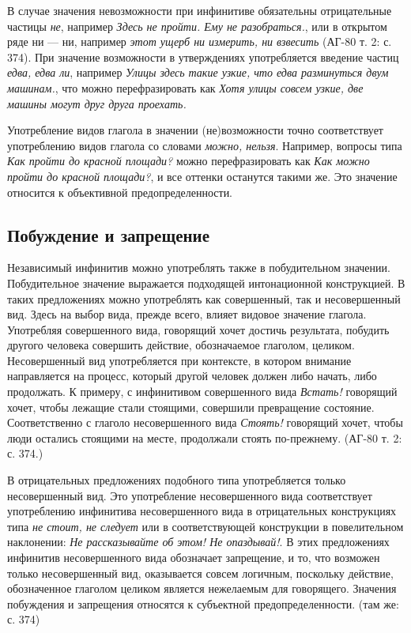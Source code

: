 В случае значения невозможности при инфинитиве обязательны отрицательные частицы \textit{не}, например \textit{Здесь не пройти. Ему не разобраться.}, или в открытом ряде ни --- ни, например \textit{этот ущерб ни измерить, ни взвесить} (АГ-80 т. 2: с. 374). При значение возможности в утверждениях употребляется введение частиц \textit{едва, едва ли}, например \textit{Улицы здесь такие узкие, что едва разминуться двум машинам.}, что можно перефразировать как \textit{Хотя улицы совсем узкие, две машины могут друг друга проехать.} 

Употребление видов глагола в значении (не)возможности точно соответствует употреблению видов глагола со словами \textit{можно, нельзя}. Например, вопросы типа \textit{Как пройти до красной площади?} можно перефразировать как \textit{Как можно пройти до красной площади?}, и все оттенки останутся такими же. Это значение относится к объективной предопределенности.

\subsection{Побуждение и запрещение}

Независимый инфинитив можно употреблять также в побудительном значении. Побудительное значение выражается подходящей интонационной конструкцией. В таких предложениях можно употреблять как совершенный, так и несовершенный вид. Здесь на выбор вида, прежде всего, влияет видовое значение глагола. Употребляя совершенного вида, говорящий хочет достичь результата, побудить другого человека совершить действие, обозначаемое глаголом, целиком. Несовершенный вид употребляется при контексте, в котором внимание направляется на процесс, который другой человек должен либо начать, либо продолжать. К примеру, с инфинитивом совершенного вида \textit{Встать!} говорящий хочет, чтобы лежащие стали стоящими, совершили превращение состояние. Соответственно с глаголо несовершенного вида \textit{Стоять!} говорящий хочет, чтобы люди остались стоящими на месте, продолжали стоять по-прежнему. (АГ-80 т. 2: с. 374.) 

В отрицательных предложениях подобного типа употребляется только несовершенный вид. Это употребление несовершенного вида соответствует употреблению инфинитива несовершенного вида в отрицательных конструкциях типа \textit{не стоит, не следует} или в соответствующей конструкции в повелительном наклонении: \textit{Не рассказывайте об этом! Не опаздывай!}. В этих предложениях инфинитив несовершенного вида обозначает запрещение, и то, что возможен только несовершенный вид, оказывается совсем логичным, поскольку действие, обозначенное глаголом целиком является нежелаемым для говорящего. Значения побуждения и запрещения относятся к субъектной предопределенности. (там же: с. 374)

